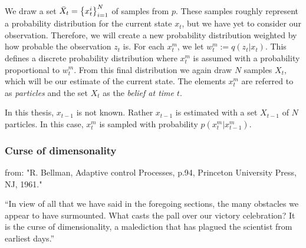 We draw a set $\bar{X}_t = \left\{x_{t}^{i}\right\}_{i=1}^{N}$ of samples from $p$. These samples roughly represent a probability distribution for the current state $x_t$, but we have yet to consider our observation. Therefore, we will create a new probability distribution weighted by how probable the observation $z_t$ is. For each $x_t^m$, we let $w_t^m := q\left(z_t | x_t\right)$. This defines a discrete probability distribution where $x_t^m$ is assumed with a probability proportional to $w_t^m$. From this final distribution we again draw $N$ samples $X_t$, which will be our estimate of the current state. The elements $x_t^m$ are referred to as \emph{particles} and the set $X_t$ as the \emph{belief at time $t$}.

In this thesis, $x_{t-1}$ is not known. Rather $x_{t-1}$ is estimated with a set $X_{t-1}$ of $N$ particles. In this case, $x_t^m$ is sampled with probability $p\left(x_t^m | x_{t-1}^m\right)$.



\subsubsection{Curse of dimensonality}




from:
"R. Bellman, Adaptive control Processes, p.94, Princeton University Press, NJ,
1961."

“In view of all that we have said in the foregoing
sections, the many obstacles we appear to have
surmounted. What casts the pall over our victory
celebration? It is the curse of dimensionality, a
malediction that has plagued the scientist from
earliest days.”


